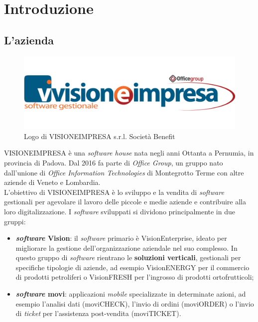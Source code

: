 \chapter{Introduzione}
\label{cap:introduzione}

\section{L'azienda}

\vspace{-3mm}

\begin{figure}[!h]
    \centering 
    \includegraphics[width=0.6\columnwidth]{images/logo-visioneimpresa.png} 
    \caption{Logo di VISIONEIMPRESA s.r.l. Società Benefit}
\end{figure}

\noindent VISIONEIMPRESA è una \textit{software house} nata negli anni Ottanta a Pernumia, in provincia di Padova. Dal 2016 fa parte di \textit{Office Group}, un gruppo nato dall'unione di \textit{Office Information Technologies} di Montegrotto Terme con altre aziende di Veneto e Lombardia.\\
L'obiettivo di VISIONEIMPRESA è lo sviluppo e la vendita di \textit{software} gestionali per agevolare il lavoro delle piccole e medie aziende e contribuire alla loro digitalizzazione. I \textit{software} sviluppati si dividono principalmente in due gruppi:
\begin{itemize}
    \item \textbf{\textit{software} Vision}: il \textit{software} primario è VisionEnterprise, ideato per migliorare la gestione dell'organizzazione aziendale nel suo complesso. In questo gruppo di \textit{software} rientrano le \textbf{soluzioni verticali}, gestionali per specifiche tipologie di aziende, ad esempio VisionENERGY per il commercio di prodotti petroliferi o VisionFRESH per l'ingrosso di prodotti ortofrutticoli;
    \item \textbf{\textit{software} movi}: applicazioni \textit{mobile} specializzate in determinate azioni, ad esempio l'analisi dati (moviCHECK), l'invio di ordini (moviORDER) o l'invio di \textit{ticket} per l'assistenza post-vendita (moviTICKET).
\end{itemize}

